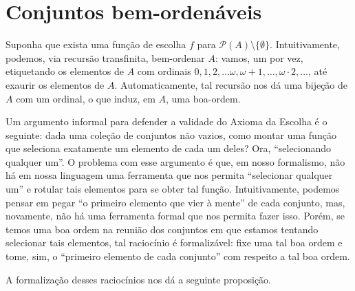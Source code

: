 \section{Conjuntos bem-ordenáveis}\label{sec:bemOrdenaveis}
Suponha que exista uma função de escolha $f$ para $\mathcal P(A)\setminus\{\emptyset\}$.
Intuitivamente, podemos, via recursão transfinita, bem-ordenar $A$:
vamos, um por vez, etiquetando os elementos de $A$ com ordinais $0, 1, 2, \dots \omega, \omega+1, \dots, \omega\cdot 2, \dots$, até exaurir os elementos de $A$.
Automaticamente, tal recursão nos dá uma bijeção de $A$ com um ordinal, o que induz, em $A$, uma boa-ordem.

Um argumento informal para defender a validade do Axioma da Escolha é o seguinte: dada uma coleção de conjuntos não vazios, como montar uma função que seleciona exatamente um elemento de cada um deles?
Ora, ``selecionando qualquer um''.
O problema com esse argumento é que, em nosso formalismo, não há em nossa linguagem uma ferramenta que nos permita ``selecionar qualquer um'' e rotular tais elementos para se obter tal função.
Intuitivamente, podemos pensar em pegar ``o primeiro elemento que vier à mente'' de cada conjunto, mas, novamente, não há uma ferramenta formal que nos permita fazer isso.
Porém, se temos uma boa ordem na reunião dos conjuntos em que estamos tentando selecionar tais elementos, tal raciocínio é formalizável: fixe uma tal boa ordem e tome, sim, o ``primeiro elemento de cada conjunto'' com respeito a tal boa ordem.

A formalização desses raciocínios nos dá a seguinte proposição.

